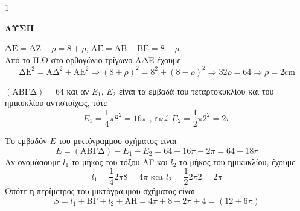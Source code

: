 \begin{ylh}{1}
    \item [Ύλη από εικόνα]
\end{ylh}
\textbf{ΛΥΣΗ}
\begin{alist}
    \item [$\alpha$.] $\text{ΔΕ} = \text{ΔΖ} + \rho = 8 + \rho$, $\text{ΑΕ} = \text{ΑΒ} - \text{ΒΕ} = 8 - \rho$ \\
    Από το Π.Θ στο ορθογώνιο τρίγωνο ΑΔΕ έχουμε
    \[ \text{ΔΕ}^2 = \text{ΑΔ}^2 + \text{ΑΕ}^2 \Rightarrow (8 + \rho)^2 = 8^2 + (8 - \rho)^2 \Rightarrow 32\rho = 64 \Rightarrow \rho = 2\text{cm} \]
    \item [$\beta$.]
    \begin{rlist}
        \item $(\text{ΑΒΓΔ}) = 64$ και αν $E_1$, $E_2$ είναι τα εμβαδά του τεταρτοκυκλίου και του ημικυκλίου αντιστοίχως, τότε
        \[ E_1 = \frac{1}{4}\pi 8^2 = 16\pi \text{ , ενώ } E_2 = \frac{1}{2}\pi 2^2 = 2\pi \]
        \item Το εμβαδόν $E$ του μικτόγραμμου σχήματος είναι
        \[ E = (\text{ΑΒΓΔ}) - E_1 - E_2 = 64 - 16\pi - 2\pi = 64 - 18\pi \]
        Αν ονομάσουμε $l_1$ το μήκος του τόξου ΑΓ και $l_2$ το μήκος του ημικυκλίου, έχουμε
        \[ l_1 = \frac{1}{4}2\pi 8 = 4\pi \text{ και } l_2 = \frac{1}{2}2\pi 2 = 2\pi \]
        Οπότε η περίμετρος του μικτόγραμμου σχήματος είναι
        \[ S = l_1 + \text{ΒΓ} + l_2 + \text{AH} = 4\pi + 8 + 2\pi + 4 = (12 + 6\pi) \]
    \end{rlist}
\end{alist}